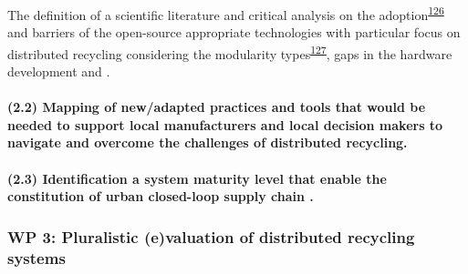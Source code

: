 \documentclass[
  12pt,
  a4paperpaper,
  onecolumn]{article}
\let\oldparagraph\paragraph
\renewcommand{\paragraph}[1]{\oldparagraph{#1}\mbox{}}
\let\paragraph\oldparagraph
\begin{document}
The definition of a scientific literature and critical analysis on the
adoption\textsuperscript{\protect\hyperlink{ref-reinauer2021}{126}} and
barriers of the open-source appropriate technologies with particular
focus on distributed recycling considering the modularity
types\textsuperscript{\protect\hyperlink{ref-gavras2021}{127}}, gaps in
the hardware development and .

\hypertarget{mapping-of-newadapted-practices-and-tools-that-would-be-needed-to-support-local-manufacturers-and-local-decision-makers-to-navigate-and-overcome-the-challenges-of-distributed-recycling.}{%
\paragraph{(2.2) Mapping of new/adapted practices and tools that would
be needed to support local manufacturers and local decision makers to
navigate and overcome the challenges of distributed
recycling.}\label{mapping-of-newadapted-practices-and-tools-that-would-be-needed-to-support-local-manufacturers-and-local-decision-makers-to-navigate-and-overcome-the-challenges-of-distributed-recycling.}}

\hypertarget{identification-a-system-maturity-level-that-enable-the-constitution-of-urban-closed-loop-supply-chain-.}{%
\paragraph{(2.3) Identification a system maturity level that enable the
constitution of urban closed-loop supply chain
.}\label{identification-a-system-maturity-level-that-enable-the-constitution-of-urban-closed-loop-supply-chain-.}}

\hypertarget{wp-3-pluralistic-evaluation-of-distributed-recycling-systems}{%
\subsubsection{WP 3: Pluralistic (e)valuation of distributed recycling
systems}\label{wp-3-pluralistic-evaluation-of-distributed-recycling-systems}}
\end{document}
